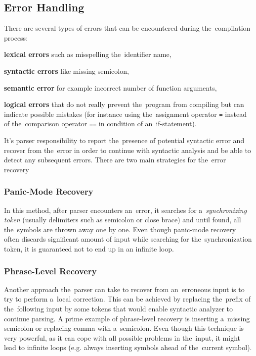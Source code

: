 \documentclass[
  digital, %
  table,   %
  lof,     %
  lot,     %
  oneside,
]{fithesis3}
\begin{document}
  \subsection{Error Handling}
There are several types of errors that can be encountered during the~compilation process:
\begin{compactitem}
  \item\textbf{lexical errors} such as misspelling the~identifier name,
  \item\textbf{syntactic errors} like missing semicolon,
  \item\textbf{semantic error} for example incorrect number of function arguments,
  \item\textbf{logical errors} that do not really prevent the~program from compiling but can indicate possible mistakes (for instance using the~assignment operator \texttt{=} instead of the~comparison operator \texttt{==} in condition of an~if-statement).
\end{compactitem} 

It's parser responsibility to report the~presence of potential syntactic error and recover from the~error in order to continue with syntactic analysis and be able to detect any subsequent errors. There are two main strategies for the~error recovery~\cite{dragon-book}

  \subsubsection{\textbf{Panic-Mode Recovery}}
In this method, after parser encounters an~error, it searches for a~\textit{synchronizing token} (usually delimiters such as semicolon or close brace) and until found, all the~symbols are thrown away one by one. Even though panic-mode recovery often discards significant amount of input while searching for the~synchronization token, it is guaranteed not to end up in an infinite loop.

  \subsubsection{\textbf{Phrase-Level Recovery}}
Another approach the~parser can take to recover from an~erroneous input is to try to perform a~local correction. This can be achieved by replacing the~prefix of the~following input by some tokens that would enable syntactic analyzer to continue parsing. A prime example of phrase-level recovery is inserting a~missing semicolon or replacing comma with a~semicolon. Even though this technique is very powerful, as it can cope with all possible problems in the~input, it might lead to infinite loops (e.g. always inserting symbols ahead of the~current symbol).
\end{document}
